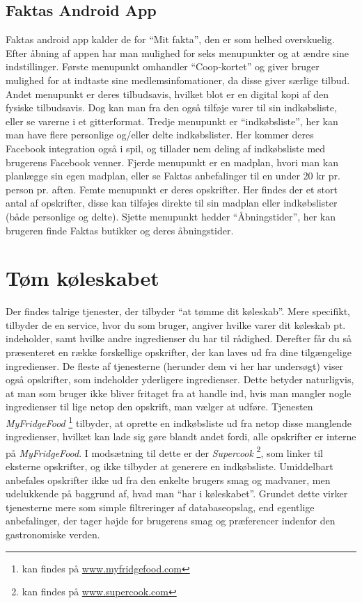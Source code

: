 \subsection{Faktas Android App}
Faktas android app kalder de for ``Mit fakta'', den er som helhed overskuelig.
Efter åbning af appen har man mulighed for seks menupunkter og at ændre sine indstillinger.
Første menupunkt omhandler ``Coop-kortet'' og giver bruger mulighed for at indtaste sine medlemsinfomationer, da disse giver særlige tilbud.
Andet menupunkt er deres tilbudsavis, hvilket blot er en digital kopi af den fysiske tilbudsavis. 
Dog kan man fra den også tilføje varer til sin indkøbsliste, eller se varerne i et gitterformat.
Tredje menupunkt er ``indkøbsliste'', her kan man have flere personlige og/eller delte indkøbslister.
Her kommer deres Facebook integration også i spil, og tillader nem deling af indkøbsliste med brugerens Facebook venner.
Fjerde menupunkt er en madplan, hvori man kan planlægge sin egen madplan, eller se Faktas anbefalinger til en under 20 kr pr. person pr. aften.
Femte menupunkt er deres opskrifter.
Her findes der et stort antal af opskrifter, disse kan tilføjes direkte til sin madplan eller indkøbslister (både personlige og delte).
Sjette menupunkt hedder ``Åbningstider'', her kan brugeren finde Faktas butikker og deres åbningstider. 


\section{Tøm køleskabet}
Der findes talrige tjenester, der tilbyder “at tømme dit køleskab”. 
Mere specifikt, tilbyder de en service, hvor du som bruger, angiver hvilke varer dit køleskab pt. indeholder, samt hvilke andre ingredienser du har til rådighed. 
Derefter får du så præsenteret en række forskellige opskrifter, der kan laves ud fra dine tilgængelige ingredienser. 
De fleste af tjenesterne (herunder dem vi her har undersøgt) viser også opskrifter, som indeholder yderligere ingredienser. 
Dette betyder naturligvis, at man som bruger ikke bliver fritaget fra at handle ind, hvis man mangler nogle ingredienser til lige netop den opskrift, man vælger at udføre. 
Tjenesten \textit{MyFridgeFood} \footnote{kan findes på \underline{www.myfridgefood.com}} tilbyder, at oprette en indkøbsliste ud fra netop disse manglende ingredienser, hvilket kan lade sig gøre blandt andet fordi, alle opskrifter er interne på \textit{MyFridgeFood}. 
I modsætning til dette er der \textit{Supercook} \footnote{kan findes på \underline{www.supercook.com}}, som linker til eksterne opskrifter, og ikke tilbyder at generere en indkøbsliste. 
Umiddelbart anbefales opskrifter ikke ud fra den enkelte brugers smag og madvaner, men udelukkende på baggrund af, hvad man “har i køleskabet”. 
Grundet dette virker tjenesterne mere som simple filtreringer af databaseopslag, end egentlige anbefalinger, der tager højde for brugerens smag og præferencer indenfor den gastronomiske verden.

